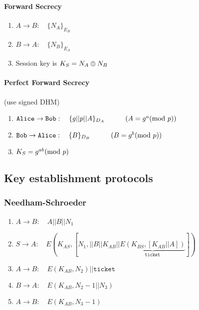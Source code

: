 \paragraph{Forward Secrecy}
\begin{enumerate}
    \item $A\rightarrow B:\hspace{1em} \{N_A\}_{E_B}$
    \item $B\rightarrow A:\hspace{1em} \{N_B\}_{E_A}$
    \item Session key is $K_S=N_A\oplus N_B$
\end{enumerate}
\paragraph{Perfect Forward Secrecy} (use signed DHM)
\begin{enumerate}
    \item $\texttt{Alice}\rightarrow \texttt{Bob}:\hspace{1em} \{g||p||A\}_{D_A}\hspace{3em} (A=g^a(\mathrm{mod}\ p))$
    \item $\texttt{Bob}\rightarrow \texttt{Alice}:\hspace{1em} \{B\}_{D_B}\hspace{3em} (B=g^b(\mathrm{mod}\ p))$
    \item $K_S=g^{ab}(\mathrm{mod}\ p)$
\end{enumerate}
\subsection{Key establishment protocols}
\subsubsection{Needham-Schroeder}
\begin{enumerate}
    \item $A\rightarrow B:\hspace{1em} A||B||N_1$
    \item $S\rightarrow A:\hspace{1em} E(K_{AS},[N_1,||B||K_{AB}||\underbrace{E(K_{BS},[K_{AB}||A])}_{\texttt{ticket}}])$
    \item $A\rightarrow B:\hspace{1em} E(K_{AB},N_2)||\texttt{ticket}$
    \item $B\rightarrow A:\hspace{1em} E(K_{AB},N_2-1||N_3)$
    \item $A\rightarrow B:\hspace{1em} E(K_{AB},N_3-1)$
\end{enumerate}
